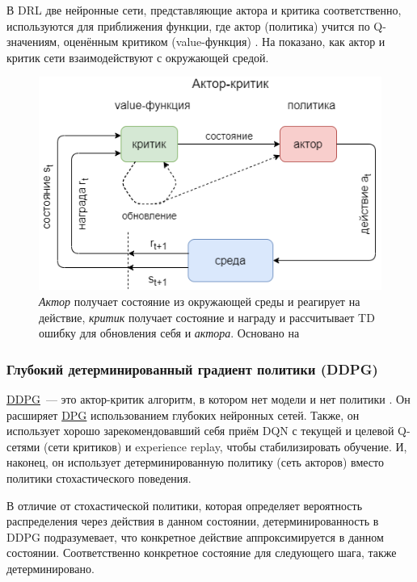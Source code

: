 В DRL две нейронные сети, представляющие актора и критика соответственно, используются для приближения функции, где актор (политика) учится по Q-значениям, оценённым критиком (value-функция) \cite{Arulkumaran_2017}. На  показано, как актор и критик сети взаимодействуют с окружающей средой.

\begin{figure}[ht!]
    \center
    \includegraphics [scale=0.60] {my_folder/images/ch1/RL-actor-critic.png}
    \caption{{\itshape Актор} получает состояние из окружающей среды и реагирует на действие, {\itshape критик} получает состояние и награду и рассчитывает TD ошибку для обновления себя и {\itshape актора}. Основано на \cite{Arulkumaran_2017}}
    \label{fig:ch1-RL-actor-critic}
\end{figure}

\subsubsection{Глубокий детерминированный градиент политики (DDPG)}

\hyperref[acr:ddpg]{DDPG}~--- это актор-критик алгоритм, в котором нет модели и нет политики \cite{lillicrap2015continuous}. Он расширяет \hyperref[acr:dpg]{DPG} использованием глубоких нейронных сетей. Также, он использует хорошо зарекомендовавший себя приём DQN с текущей и целевой Q-сетями (сети критиков) и experience replay, чтобы стабилизировать обучение. И, наконец, он использует детерминированную политику (сеть акторов) вместо политики стохастического поведения.

В отличие от стохастической политики, которая определяет вероятность распределения через действия в данном состоянии, детерминированность в DDPG подразумевает, что конкретное действие аппроксимируется в данном состоянии. Соответственно конкретное состояние для следующего шага, также детерминировано.

